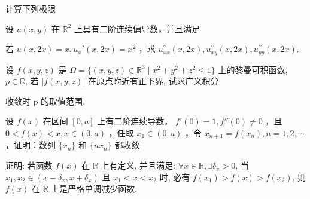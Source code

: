 \par{}
计算下列极限\par
\nopagebreak[4]
\par{}
设 $u(x, y)$ 在 $\mathbb{R}^2$ 上具有二阶连续偏导数，并且满足\par
\nopagebreak[4]
若 $u(x,2x) = x,u_x'(x,2x) = x^2$ ，求 $u_{xx}^{\prime \prime}(x,2x),u_{xy}^{\prime \prime}(x,2x),u_{yy}^{\prime \prime}(x,2x).$\par
\par{}
设 $f(x, y, z)$ 是 $\Omega = \{(x, y, z) \in \mathbb{R}^3 \mid x^2 + y^2 + z^2 \leq 1\}$ 上的黎曼可积函数, $p \in \mathbb{R}$, 若 $|f(x, y, z)|$ 在原点附近有正下界, 试求广义积分\par
\nopagebreak[4]
收敛时 p 的取值范围.\par
设  $f(x)$  在区间  $[0, a]$  上有二阶连续导数， $f'(0) = 1, f''(0) \neq 0$ ，且  $0 < f(x) < x, x \in (0, a)$ ，任取  $x_{1} \in (0, a)$ ，令  $x_{n+1} = f(x_{n}), n = 1, 2, \cdots$ ，证明：数列  $\{x_{n}\}$  和  $\{nx_{n}\}$  都收敛.\par
证明: 若函数 $f(x)$ 在 $\mathbb{R}$ 上有定义, 并且满足: $\forall x \in \mathbb{R}, \exists \delta_x > 0$, 当 $x_1, x_2 \in (x - \delta_x, x + \delta_x)$ 且 $x_1 < x < x_2$ 时, 必有 $f(x_1) > f(x) > f(x_2)$, 则 $f(x)$ 在 $\mathbb{R}$ 上是严格单调减少函数.\par
